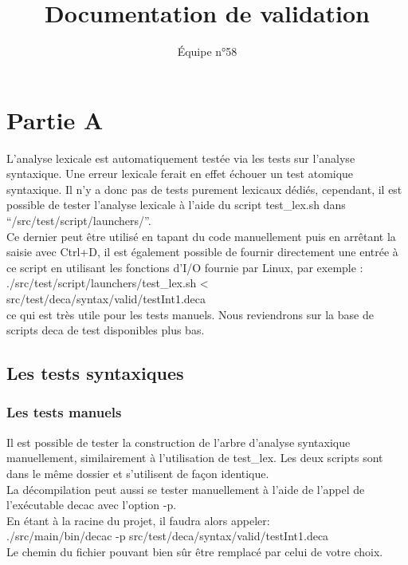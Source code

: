 \documentclass[a4paper]{article}
\title{Documentation de validation}
\author{\'Equipe n°58}
\begin{document}
\maketitle

\section{Partie A}

L'analyse lexicale est automatiquement testée via les tests sur l'analyse syntaxique. Une erreur lexicale ferait en effet échouer un test atomique syntaxique. Il n'y a donc pas de tests purement lexicaux dédiés, cependant, il est possible de tester l'analyse lexicale à l'aide du script test\_lex.sh dans “/src/test/script/launchers/”.\\

Ce dernier peut être utilisé en tapant du code manuellement puis en arrêtant la saisie avec Ctrl+D, il est également possible de fournir directement une entrée à ce script en utilisant les fonctions d'I/O fournie par Linux, par exemple :\\
./src/test/script/launchers/test\_lex.sh < src/test/deca/syntax/valid/testInt1.deca\\
ce qui est très utile pour les tests manuels. Nous reviendrons sur la base de scripts deca de test disponibles plus bas.\\

\subsection{Les tests syntaxiques}

\subsubsection{Les tests manuels}

Il est possible de tester la construction de l'arbre d'analyse syntaxique manuellement, similairement à l'utilisation de test\_lex. Les deux scripts sont dans le même dossier et s'utilisent de façon identique.\\ 

La décompilation peut aussi se tester manuellement à l'aide de l'appel de l'exécutable decac avec l'option -p.\\

En étant à la racine du projet, il faudra alors appeler:\\
./src/main/bin/decac -p src/test/deca/syntax/valid/testInt1.deca\\
Le chemin du fichier pouvant bien sûr être remplacé par celui de votre choix.\\
\end{document}
